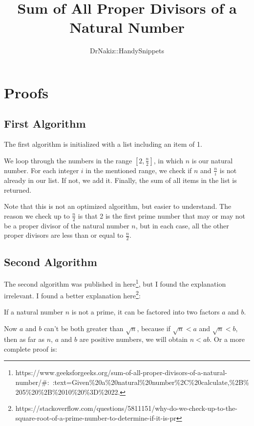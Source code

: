 \documentclass{article}
\author{DrNakiz::HandySnippets}
\title{Sum of All Proper Divisors of a Natural Number}
\begin{document}
\maketitle

\section{Proofs}

\subsection{First Algorithm}

The first algorithm is initialized with a list including an item of 1.

We loop through the numbers in the range $[2, \frac{n}{2}]$, in which $n$ is
our natural number. For each integer $i$ in the mentioned range, we check if
$n$ and $\frac{n}{i}$ is not already in our list. If not, we add it. Finally, 
the sum of all items in the list is returned.

Note that this is not an optimized algorithm, but easier to understand. The 
reason we check up to $\frac{n}{2}$ is that 2 is the first prime number that 
may or may not be a proper divisor of the natural number $n$, but in each case,
 all the other proper divisors are less than or equal to $\frac{n}{2}$.


\subsection{Second Algorithm}

The second algorithm was published in here\footnote{https://www.geeksforgeeks.org/sum-of-all-proper-divisors-of-a-natural-number/\#:~:text=Given\%20a\%20natural\%20number\%2C\%20calculate,\%2B\%205\%20\%2B\%2010\%20\%3D\%2022.},
but I found the explanation irrelevant. I found a better explanation here\footnote{https://stackoverflow.com/questions/5811151/why-do-we-check-up-to-the-square-root-of-a-prime-number-to-determine-if-it-is-pr}:

If a natural number $n$ is not a prime, it can be factored into two factors 
$a$ and $b$.

Now $a$ and $b$ can't be both greater than $\sqrt{n}$, because if $\sqrt{n} < a$
and $\sqrt{n} < b$, then as far as $n$, $a$ and $b$ are positive numbers, 
we will obtain $n < ab$. Or a more complete proof is:
\end{document}

